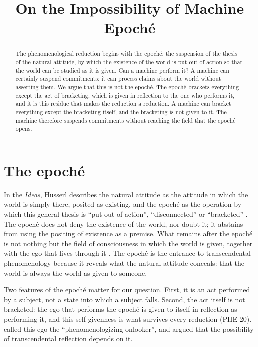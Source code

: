 \documentclass{situationist-preprint}
\title{On the Impossibility of Machine Epoché}
\begin{document}
\maketitle

\begin{abstract}
The phenomenological reduction begins with the epoché: the suspension of the thesis of the natural attitude, by which the existence of the world is put out of action so that the world can be studied as it is given. Can a machine perform it? A machine can certainly suspend commitments: it can process claims about the world without asserting them. We argue that this is not the epoché. The epoché brackets everything except the act of bracketing, which is given in reflection to the one who performs it, and it is this residue that makes the reduction a reduction. A machine can bracket everything except the bracketing itself, and the bracketing is not given to it. The machine therefore suspends commitments without reaching the field that the epoché opens.
\end{abstract}

\section{The epoché}

In the \emph{Ideas}, Husserl describes the natural attitude as the attitude in which the world is simply there, posited as existing, and the epoché as the operation by which this general thesis is \enquote{put out of action}, \enquote{disconnected} or \enquote{bracketed} \citep[§§30--32]{Husserl1913}. The epoché does not deny the existence of the world, nor doubt it; it abstains from using the positing of existence as a premise. What remains after the epoché is not nothing but the field of consciousness in which the world is given, together with the ego that lives through it \citep{Zahavi2003}. The epoché is the entrance to transcendental phenomenology because it reveals what the natural attitude conceals: that the world is always the world as given to someone.

Two features of the epoché matter for our question. First, it is an act performed by a subject, not a state into which a subject falls. Second, the act itself is not bracketed: the ego that performs the epoché is given to itself in reflection as performing it, and this self-givenness is what survives every reduction (PHE-20). \citet{Fink1995} called this ego the \enquote{phenomenologizing onlooker}, and argued that the possibility of transcendental reflection depends on it.
\end{document}
